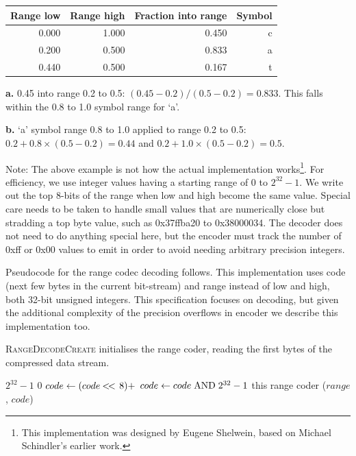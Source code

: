 \documentclass[a4paper]{article}
\begin{document}
\begin{threeparttable}[t]
\begin{tabular}{rrrr}
\hline
\textbf{Range low} & \textbf{Range high} & \textbf{Fraction into range} & \textbf{Symbol}\\
\hline
0.000 & 1.000 & 0.450 & c\\
0.200 & 0.500 & 0.833\tnote{\textbf{a}} & a\\
0.440\tnote{\textbf{b}} & 0.500 & 0.167 & t\\
\hline
\end{tabular}
\begin{tablenotes}
\item{\textbf{a.}} 0.45 into range 0.2 to 0.5: $(0.45-0.2)/(0.5-0.2) = 0.833$.
This falls within the 0.8 to 1.0 symbol range for `a'.
\item{\textbf{b.}} `a' symbol range 0.8 to 1.0 applied to range 0.2 to 0.5:  $0.2+0.8\times(0.5-0.2) = 0.44$ and $0.2+1.0\times(0.5-0.2) = 0.5$.
\end{tablenotes}
\end{threeparttable}

Note: The above example is not how the actual implementation works\footnote{This implementation was designed by Eugene Shelwein, based on Michael Schindler's earlier work.}.
For efficiency, we use integer values having a starting range of 0 to $2^{32}-1$.
We write out the top 8-bits of the range when low and high become the same value.
Special care needs to be taken to handle small values that are numerically close but stradding a top byte value, such as 0x37ffba20 to 0x38000034.
The decoder does not need to do anything special here, but the encoder must track the number of 0xff or 0x00 values to emit in order to avoid needing arbitrary precision integers.

Pseudocode for the range codec decoding follows.
This implementation uses code (next few bytes in the current bit-stream) and range instead of low and high, both 32-bit unsigned integers.
This specification focuses on decoding, but given the additional complexity of the precision overflows in encoder we describe this implementation too.

\textsc{RangeDecodeCreate} initialises the range coder, reading the first bytes of the compressed data stream.

\begin{algorithmic}[1]
  \settowidth{\maxwidth}{range\ }
  \State {} $2^{32}-1$
  \State {} $0$
    \State $code \gets (code \mathbin{<\mkern-3mu<\,} 8) + $
  \EndFor
  \State $code \gets code \bitand 2^{32}-1$
  \State \Return this range coder ($range$, $code$)
\EndFunction
\end{algorithmic}
\end{document}
